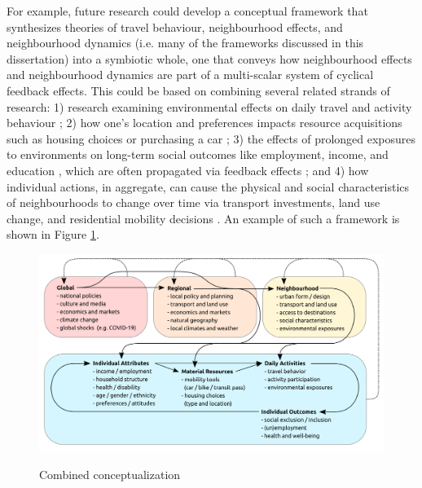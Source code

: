 For example, future research could develop a conceptual framework that synthesizes theories of travel behaviour, neighbourhood effects, and neighbourhood dynamics (i.e. many of the frameworks discussed in this dissertation) into a symbiotic whole, one that conveys how neighbourhood effects and neighbourhood dynamics are part of a multi-scalar system of cyclical feedback effects. This could be based on combining several related strands of research: 1) research examining environmental effects on daily travel and activity behaviour \cite{hanson_determinants_1982,ewing_travel_2010}; 2) how one's location and preferences impacts resource acquisitions such as housing choices or purchasing a car \cite{lee_neighborhood_1994,klein_millennials_2017}; 3) the effects of prolonged exposures to environments on long-term social outcomes like employment, income, and education \cite{sampson_assessing_2002,chetty_effects_2016}, which are often propagated via feedback effects \cite{wilson_truly_2012,lucas_transport_2012}; and 4) how individual actions, in aggregate, can cause the physical and social characteristics of neighbourhoods to change over time via transport investments, land use change, and residential mobility decisions \cite{wegener_land-use_2004,wilson_truly_2012,van_ham_understanding_2013}. An example of such a framework is shown in Figure \ref{fig:conceptual}.

\begin{figure}[H]
	\caption{{Combined conceptualization}}
	\includegraphics[width=6in]{figures/my_idea.png}
	\centering
	\label{fig:conceptual}
\end{figure}

